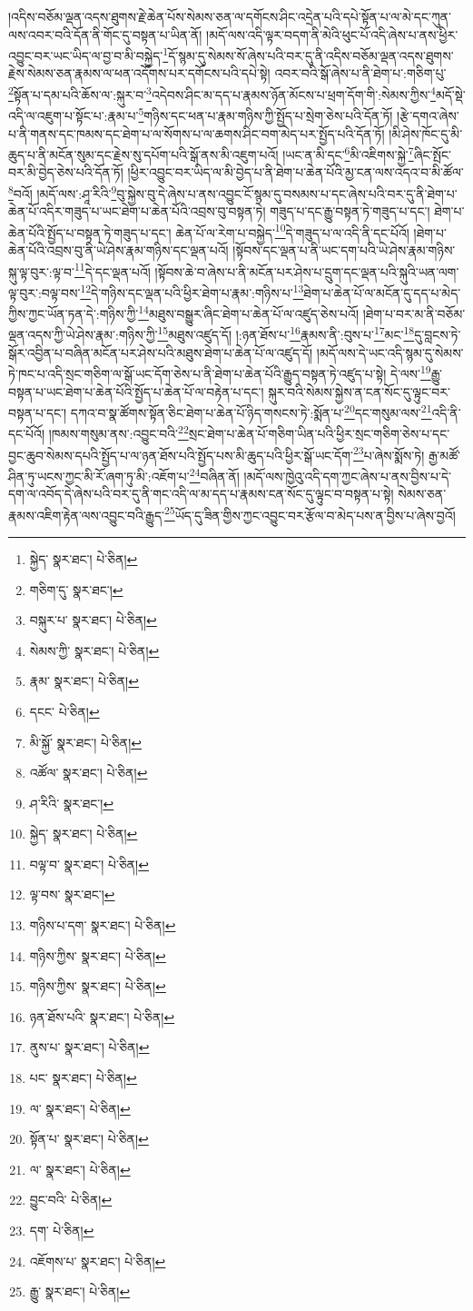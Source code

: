 །འདིས་བཅོམ་ལྡན་འདས་ཐུགས་རྗེ་ཆེན་པོས་སེམས་ཅན་ལ་དགོངས་ཤིང་འདྲེན་པའི་དཔེ་སྟོན་པ་ལ་མེ་དང་ཀུན་ལས་འབར་བའི་དོན་ནི་གོང་དུ་བསྟན་པ་ཡིན་ནོ། །མདོ་ལས་འདི་ལྟར་བདག་ནི་མེའི་ཕུང་པོ་འདི་ཞེས་པ་ནས་ཕྱིར་འབྱུང་བར་ཡང་ཡིད་ལ་བྱ་བ་མི་བསྐྱེད་\footnote{སྐྱེད་  སྣར་ཐང་།  པེ་ཅིན། }དོ་སྙམ་དུ་སེམས་སོ་ཞེས་པའི་བར་དུ་ནི་འདིས་བཅོམ་ལྡན་འདས་ཐུགས་རྗེས་སེམས་ཅན་རྣམས་ལ་ཕན་འདོགས་པར་དགོངས་པའི་དཔེ་སྟེ། འབར་བའི་སྒོ་ཞེས་པ་ནི་ཐེག་པ་:གཅིག་པུ་\footnote{གཅིག་དུ་  སྣར་ཐང་། }སྟོན་པ་དམ་པའི་ཆོས་ལ་:སྐུར་བ་\footnote{བསྐུར་པ་  སྣར་ཐང་།  པེ་ཅིན། }འདེབས་ཤིང་མ་དད་པ་རྣམས་ཉོན་མོངས་པ་ཕྲག་དོག་གི་:སེམས་ཀྱིས་\footnote{སེམས་ཀྱི་  སྣར་ཐང་།  པེ་ཅིན། }མདོ་སྡེ་འདི་ལ་འཇུག་པ་སྟོང་པ་:རྣམ་པ་\footnote{རྣམ་  སྣར་ཐང་།  པེ་ཅིན། }གཉིས་དང་ཕན་པ་རྣམ་གཉིས་ཀྱི་སྤྱོད་པ་སྲེག་ཅེས་པའི་དོན་ཏོ། །རྩེ་དགའ་ཞེས་པ་ནི་གནས་དང་ཁམས་དང་ཐེག་པ་ལ་སོགས་པ་ལ་ཆགས་ཤིང་བག་མེད་པར་སྤྱོད་པའི་དོན་ཏོ། །མི་ཤེས་ཁོང་དུ་མི་ཆུད་པ་ནི་མངོན་སུམ་དང་རྗེས་སུ་དཔོག་པའི་སྒོ་ནས་མི་འཇུག་པའོ། །ཡང་ན་མི་དང་\footnote{དངང་  པེ་ཅིན། }མི་འཇིགས་སྐྱེ་\footnote{མི་སྐྱོ་  སྣར་ཐང་།  པེ་ཅིན། }ཞིང་སྤོང་བར་མི་བྱེད་ཅེས་པའི་དོན་ཏོ། །ཕྱིར་འབྱུང་བར་ཡིད་ལ་མི་བྱེད་པ་ནི་ཐེག་པ་ཆེན་པོའི་མྱ་ངན་ལས་འདའ་བ་མི་ཚོལ་\footnote{འཚོལ་  སྣར་ཐང་།  པེ་ཅིན། }བའོ། །མདོ་ལས་:ཤཱ་རིའི་\footnote{ཤ་རིའི་  སྣར་ཐང་། }བུ་སྐྱེས་བུ་དེ་ཞེས་པ་ནས་འབྱུང་ངོ་སྙམ་དུ་བསམས་པ་དང་ཞེས་པའི་བར་དུ་ནི་ཐེག་པ་ཆེན་པོ་འདིར་གཟུད་པ་ཡང་ཐེག་པ་ཆེན་པོའི་འབྲས་བུ་བསྟན་ཏེ། གཟུད་པ་དང་རྒྱུ་བསྟན་ཏེ་གཟུད་པ་དང་། ཐེག་པ་ཆེན་པོའི་སྤྱོད་པ་བསྟན་ཏེ་གཟུད་པ་དང་། ཆེན་པོ་ལ་རེག་པ་བསྐྱེད་\footnote{སྐྱེད་  སྣར་ཐང་།  པེ་ཅིན། }དེ་གཟུད་པ་ལ་འདི་ནི་དང་པོའོ། །ཐེག་པ་ཆེན་པོའི་འབྲས་བུ་ནི་ཡེ་ཤེས་རྣམ་གཉིས་དང་ལྡན་པའོ། །སྟོབས་དང་ལྡན་པ་ནི་ཡང་དག་པའི་ཡེ་ཤེས་རྣམ་གཉིས་སྐུ་ལྟ་བུར་:ལྟ་བ་\footnote{བལྟ་བ་  སྣར་ཐང་།  པེ་ཅིན། }དེ་དང་ལྡན་པའོ། །སྟོབས་ཆེ་བ་ཞེས་པ་ནི་མངོན་པར་ཤེས་པ་དྲུག་དང་ལྡན་པའི་སྐུའི་ཡན་ལག་ལྟ་བུར་:བལྟ་བས་\footnote{ལྟ་བས་  སྣར་ཐང་། }དེ་གཉིས་དང་ལྡན་པའི་ཕྱིར་ཐེག་པ་རྣམ་:གཉིས་པ་\footnote{གཉིས་པ་དག་  སྣར་ཐང་།  པེ་ཅིན། }ཐེག་པ་ཆེན་པོ་ལ་མངོན་དུ་དད་པ་མེད་ཀྱིས་ཀྱང་ཡོན་ཏན་དེ་:གཉིས་ཀྱི་\footnote{གཉིས་ཀྱིས་  སྣར་ཐང་།  པེ་ཅིན། }མཐུས་བསྒྱུར་ཞིང་ཐེག་པ་ཆེན་པོ་ལ་འཛུད་ཅེས་པའོ། །ཐེག་པ་བར་མ་ནི་བཅོམ་ལྡན་འདས་ཀྱི་ཡེ་ཤེས་རྣམ་:གཉིས་ཀྱི་\footnote{གཉིས་ཀྱིས་  སྣར་ཐང་།  པེ་ཅིན། }མཐུས་འཛུད་དོ། །:ཉན་ཐོས་པ་\footnote{ཉན་ཐོས་པའི་  སྣར་ཐང་།  པེ་ཅིན། }རྣམས་ནི་:བུས་པ་\footnote{ནུས་པ་  སྣར་ཐང་།  པེ་ཅིན། }མང་\footnote{པང་  སྣར་ཐང་།  པེ་ཅིན། }དུ་བླངས་ཏེ་སྒོར་འབྱིན་པ་བཞིན་མངོན་པར་ཤེས་པའི་མཐུས་ཐེག་པ་ཆེན་པོ་ལ་འཛུད་དོ། །མདོ་ལས་དེ་ཡང་འདི་སྙམ་དུ་སེམས་ཏེ་ཁང་པ་འདི་སྲང་གཅིག་ལ་སྒོ་ཡང་དོག་ཅེས་པ་ནི་ཐེག་པ་ཆེན་པོའི་རྒྱུད་བསྟན་ཏེ་འཛུད་པ་སྟེ། དེ་ལས་\footnote{ལ་  སྣར་ཐང་།  པེ་ཅིན། }རྒྱུ་བསྟན་པ་ཡང་ཐེག་པ་ཆེན་པོའི་སྤྱོད་པ་ཆེན་པོ་ལ་བརྟེན་པ་དང་། སྐུར་བའི་སེམས་སྐྱེས་ན་ངན་སོང་དུ་ལྟུང་བར་བསྟན་པ་དང་། དཀའ་བ་སྣ་ཚོགས་སྟོན་ཅིང་ཐེག་པ་ཆེན་པོ་ཉིད་གསངས་ཏེ་:སྨོན་པ་\footnote{སྟོན་པ་  སྣར་ཐང་།  པེ་ཅིན། }དང་གསུམ་ལས་\footnote{ལ་  སྣར་ཐང་།  པེ་ཅིན། }འདི་ནི་དང་པོའོ། །ཁམས་གསུམ་ནས་:འབྱུང་བའི་\footnote{བྱུང་བའི་  པེ་ཅིན། }སྲང་ཐེག་པ་ཆེན་པོ་གཅིག་ཡིན་པའི་ཕྱིར་སྲང་གཅིག་ཅེས་པ་དང་བྱང་ཆུབ་སེམས་དཔའི་སྤྱོད་པ་ལ་ཉན་ཐོས་པའི་སྤྱོད་པས་མི་ཆུད་པའི་ཕྱིར་སྒོ་ཡང་དོག་\footnote{དག་  པེ་ཅིན། }པ་ཞེས་སྨོས་ཏེ། རྒྱ་མཚོ་ཤིན་ཏུ་ཡངས་ཀྱང་མི་རོ་ཞག་ཏུ་མི་:འཇོག་པ་\footnote{འཇོགས་པ་  སྣར་ཐང་།  པེ་ཅིན། }བཞིན་ནོ། །མདོ་ལས་ཁྱེའུ་འདི་དག་ཀྱང་ཞེས་པ་ནས་བྱིས་པ་དེ་དག་ལ་འབོད་དེ་ཞེས་པའི་བར་དུ་ནི་གང་འདི་ལ་མ་དད་པ་རྣམས་ངན་སོང་དུ་ལྟུང་བ་བསྟན་པ་སྟེ། སེམས་ཅན་རྣམས་འཇིག་རྟེན་ལས་འབྱུང་བའི་རྒྱུད་\footnote{རྒྱུ་  སྣར་ཐང་།  པེ་ཅིན། }ཡོད་དུ་ཟིན་གྱིས་ཀྱང་འབྱུང་བར་རྩོལ་བ་མེད་པས་ན་བྱིས་པ་ཞེས་བྱའོ། 
